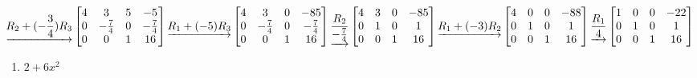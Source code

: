 \documentclass[
  11,
]{article}
\providecommand{\tightlist}{%
  \setlength{\itemsep}{0pt}\setlength{\parskip}{0pt}}
\begin{document}
\[\underrightarrow{ R_2 + (- \frac{3}{4})R_3 }
\left[\begin{matrix}4 & 3 & 5 & -5\\0 & - \frac{7}{4} & 0 & - \frac{7}{4}\\0 & 0 & 1 & 16\end{matrix}\right]
\underrightarrow{ R_1 + (-5)R_3 }
\\
\left[\begin{matrix}4 & 3 & 0 & -85\\0 & - \frac{7}{4} & 0 & - \frac{7}{4}\\0 & 0 & 1 & 16\end{matrix}\right]
\underrightarrow{ \frac{R_2}{- \frac{7}{4}} }
\left[\begin{matrix}4 & 3 & 0 & -85\\0 & 1 & 0 & 1\\0 & 0 & 1 & 16\end{matrix}\right]
\underrightarrow{ R_1 + (-3)R_2 }
\\
\left[\begin{matrix}4 & 0 & 0 & -88\\0 & 1 & 0 & 1\\0 & 0 & 1 & 16\end{matrix}\right]
\underrightarrow{ \frac{R_1}{4} }
\left[\begin{matrix}1 & 0 & 0 & -22\\0 & 1 & 0 & 1\\0 & 0 & 1 & 16\end{matrix}\right]
  \]

\begin{enumerate}
\def\labelenumi{\alph{enumi})}
\setcounter{enumi}{1}
\tightlist
\item
  \(2+6x^2\)
\end{enumerate}
\end{document}
